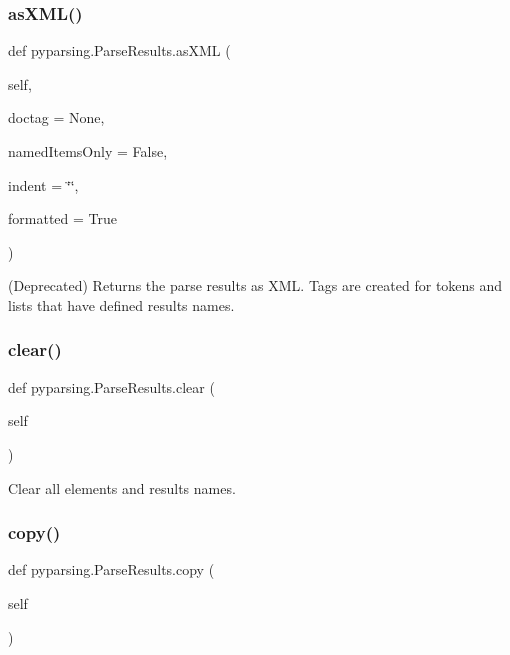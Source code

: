 \subsubsection{\texorpdfstring{as\+X\+M\+L()}{asXML()}}
{\footnotesize\ttfamily def pyparsing.\+Parse\+Results.\+as\+X\+ML (\begin{DoxyParamCaption}\item[{}]{self,  }\item[{}]{doctag = {\ttfamily None},  }\item[{}]{named\+Items\+Only = {\ttfamily False},  }\item[{}]{indent = {\ttfamily \char`\"{}\char`\"{}},  }\item[{}]{formatted = {\ttfamily True} }\end{DoxyParamCaption})}

\begin{DoxyVerb}(Deprecated) Returns the parse results as XML. Tags are created for tokens and lists that have defined results names.
\end{DoxyVerb}
 \mbox{\label{classpyparsing_1_1ParseResults_a2e60e3f784468a439b7eb784c8117900}} 
\subsubsection{\texorpdfstring{clear()}{clear()}}
{\footnotesize\ttfamily def pyparsing.\+Parse\+Results.\+clear (\begin{DoxyParamCaption}\item[{}]{self }\end{DoxyParamCaption})}

\begin{DoxyVerb}Clear all elements and results names.
\end{DoxyVerb}
 \mbox{\label{classpyparsing_1_1ParseResults_ad97f867cf901b7f3c2ff8c4c6c9a33ac}} 
\subsubsection{\texorpdfstring{copy()}{copy()}}
{\footnotesize\ttfamily def pyparsing.\+Parse\+Results.\+copy (\begin{DoxyParamCaption}\item[{}]{self }\end{DoxyParamCaption})}


